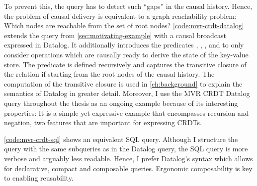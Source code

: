 To prevent this, the query has to detect such ``gaps'' in the causal history.
Hence, the problem of causal delivery is equivalent to a graph reachability
problem: Which nodes are reachable from the set of root nodes?
\ref{code:mvr-crdt-datalog} extends the query from \autoref{sec:motivating-example}
with a causal broadcast expressed in Datalog.
It additionally introduces the predicates , ,
, and  to only consider operations
which are causally ready to derive the state of the key-value store.
The  predicate is defined recursively and captures
the transitive closure of the  relation if starting from the
root nodes of the causal history.
The computation of the transitive closure is used in \ref{ch:background} to
explain the semantics of Datalog in greater detail.
Moreover, I use the \ac{MVR} \ac{CRDT} Datalog query throughout the thesis
as an ongoing example because of its interesting properties:
It is a simple yet expressive example that encompasses recursion and negation,
two features that are important for expressing \acp{CRDT}.

\ref{code:mvr-crdt-sql} shows an equivalent SQL query.
Although I structure the query with the same subqueries as in the Datalog
query, the SQL query is more verbose and arguably less readable.
Hence, I prefer Datalog's syntax which allows for declarative, compact
and composable queries. Ergonomic composability is key to enabling reusability.

